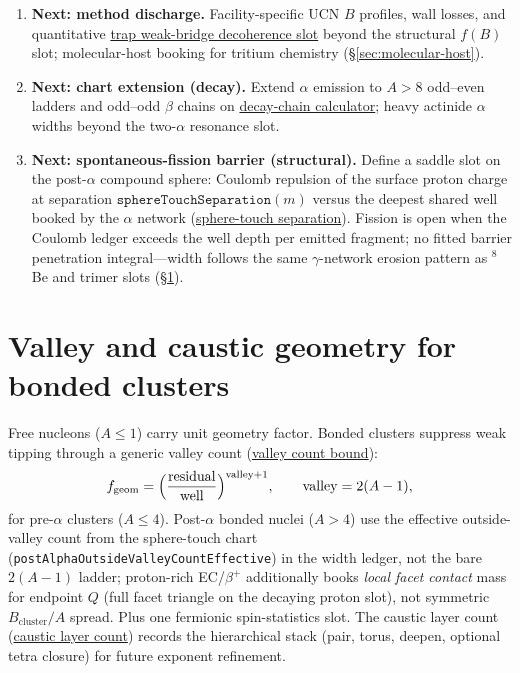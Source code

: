 \documentclass[11pt,notitlepage]{amsart}
\begin{document}
\begin{enumerate}[label=\arabic*., leftmargin=2.2em, labelsep=0.55em, itemsep=0.45em]
  a \emph{derived} lock-in principle (without the quarantined $938.272\,\mathrm{MeV}$
  input) remains open---closing the PDG mass gap on meta-harmonic readouts is the
  paired strong-sector and dressing problem named in the TUFT synthesis.
\item \textbf{Next: method discharge.}
  Facility-specific UCN $B$ profiles, wall losses, and quantitative
  \hyperref[lean:neutron-lifetime-method]{trap weak-bridge decoherence slot} beyond the structural $f(B)$ slot;
  molecular-host booking for tritium chemistry (\S\ref{sec:molecular-host}).
\item \textbf{Next: chart extension (decay).}
  Extend $\alpha$ emission to $A>8$ odd--even ladders and odd--odd $\beta$ chains on
  \hyperref[script:decay-chain]{decay-chain calculator}; heavy actinide $\alpha$ widths
  beyond the two-$\alpha$ resonance slot.
\item \textbf{Next: spontaneous-fission barrier (structural).}
  Define a saddle slot on the post-$\alpha$ compound sphere: Coulomb repulsion of the
  surface proton charge at separation $\texttt{sphereTouchSeparation}(m)$ versus the
  deepest shared well booked by the $\alpha$ network
  (\hyperref[lean:hqiv-nuclei]{sphere-touch separation}). Fission is open when the
  Coulomb ledger exceeds the well depth per emitted fragment; no fitted barrier
  penetration integral---width follows the same $\gamma$-network erosion pattern as
  $^8$Be and trimer slots (\S\ref{sec:valley}).
\end{enumerate}

\section{Valley and caustic geometry for bonded clusters}
\label{sec:valley}

Free nucleons ($A\le 1$) carry unit geometry factor. Bonded clusters suppress weak
tipping through a generic valley count (\hyperref[lean:valley-bound]{valley count bound}):
\[
  f_{\mathrm{geom}} =
    \Bigl(\frac{\mathrm{residual}}{\mathrm{well}}\Bigr)^{\mathrm{valley}+1},
  \qquad
  \mathrm{valley} = 2(A-1),
\]
for pre-$\alpha$ clusters ($A\le 4$). Post-$\alpha$ bonded nuclei ($A>4$) use the
effective outside-valley count from the sphere-touch chart
(\texttt{postAlphaOutsideValleyCountEffective}) in the width ledger, not the bare
$2(A-1)$ ladder; proton-rich EC/$\beta^+$ additionally books \emph{local facet contact}
mass for endpoint $Q$ (full facet triangle on the decaying proton slot), not symmetric
$B_{\mathrm{cluster}}/A$ spread.
Plus one fermionic spin-statistics slot. The caustic layer count
(\hyperref[lean:caustic-layers]{caustic layer count}) records the hierarchical stack
(pair, torus, deepen, optional tetra closure) for future exponent refinement.
\end{document}

